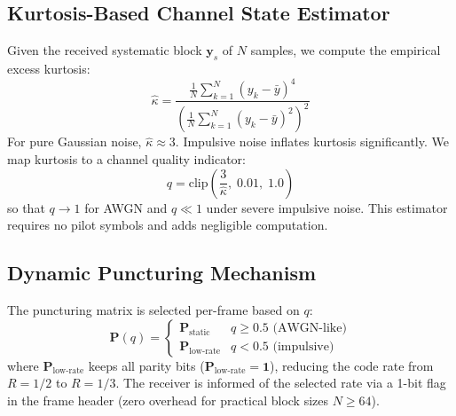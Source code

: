 \documentclass[journal,twocolumn]{IEEEtran}
\begin{document}
\subsection{Kurtosis-Based Channel State Estimator}
Given the received systematic block $\mathbf{y}_s$ of $N$ samples, we
compute the empirical excess kurtosis:
\begin{equation}
  \hat{\kappa} = \frac{\frac{1}{N}\sum_{k=1}^{N}(y_k - \bar{y})^4}
                      {\left(\frac{1}{N}\sum_{k=1}^{N}(y_k-\bar{y})^2\right)^2}
\end{equation}
For pure Gaussian noise, $\hat{\kappa} \approx 3$.  Impulsive noise
inflates kurtosis significantly.  We map kurtosis to a channel quality
indicator:
\begin{equation}
  q = \mathrm{clip}\!\left(\frac{3}{\hat{\kappa}},\; 0.01,\; 1.0\right)
\end{equation}
so that $q \to 1$ for AWGN and $q \ll 1$ under severe impulsive noise.
This estimator requires no pilot symbols and adds negligible computation.

\subsection{Dynamic Puncturing Mechanism}
The puncturing matrix is selected per-frame based on $q$:
\begin{equation}
  \mathbf{P}(q) = \begin{cases}
    \mathbf{P}_{\text{static}} & q \geq 0.5 \text{ (AWGN-like)} \\[2pt]
    \mathbf{P}_{\text{low-rate}} & q < 0.5 \text{ (impulsive)}
  \end{cases}
\end{equation}
where $\mathbf{P}_{\text{low-rate}}$ keeps all parity bits
($\mathbf{P}_{\text{low-rate}} = \mathbf{1}$), reducing the code rate
from $R=1/2$ to $R=1/3$.  The receiver is informed of the selected
rate via a 1-bit flag in the frame header (zero overhead for practical
block sizes $N \geq 64$).
\end{document}
